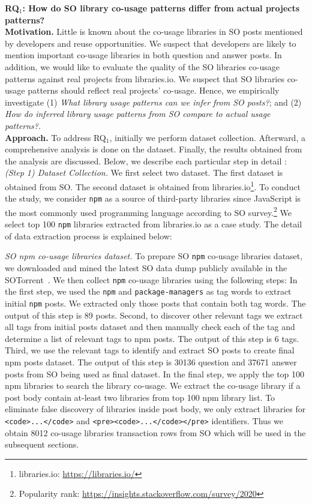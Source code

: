 \documentclass[paper]{ieice}
\newcommand{\RQOne}{\textbf{RQ$_1$: How do SO library co-usage patterns differ from actual projects patterns?}}
\newcommand{\PSOne}{\textit{What library usage patterns can we infer from SO posts?}}
\newcommand{\PSTwo}{\textit{How do inferred library usage patterns from SO compare to actual usage patterns?}}
\begin{document}
\noindent\RQOne
\\

\noindent\textbf{Motivation. }Little is known about the co-usage libraries in SO posts mentioned by developers and reuse opportunities. We suspect that developers are likely to mention important co-usage libraries in both question and answer posts. In addition, we would like to evaluate the quality of the SO libraries co-usage patterns against real projects from libraries.io. We suspect that SO libraries co-usage patterns should reflect real projects' co-usage. Hence, we empirically investigate (1) \PSOne; and (2) \PSTwo.
\\

\noindent\textbf{Approach. }To address RQ$_1$, initially we perform dataset collection.  Afterward, a comprehensive analysis is done on the dataset. Finally, the results obtained from the analysis are discussed. Below, we describe each particular step in detail :
\\

\textit{(Step 1) Dataset Collection.} We first select two dataset. The first dataset is obtained from SO. The second dataset is obtained from libraries.io\footnote{libraries.io: \url{https://libraries.io/}}.
To conduct the study, we consider \texttt{npm} as a source of third-party libraries since JavaScript is the most commonly used programming language according to SO survey.\footnote{Popularity rank: \url{https://insights.stackoverflow.com/survey/2020}}
We select top 100 \texttt{npm} libraries extracted from libraries.io as a case study. The detail of data extraction process is explained below:

\textit{SO npm co-usage libraries dataset.}
\label{subsec:DatasetD1}
To prepare SO \texttt{npm} co-usage libraries dataset, we downloaded and mined the latest SO data dump publicly available in the SOTorrent~\cite{Baltes2018SoTorrent}. We then collect \texttt{npm} co-usage libraries using the following steps: In the first step, we used the \texttt{npm} and \texttt{package-managers} as tag words to extract initial \texttt{npm} posts. We extracted only those posts that contain both tag words. The output of this step is 89 posts. Second, to discover other relevant tags we extract all tags from initial posts dataset and then manually check each of the tag and determine a list of relevant tags to npm posts. The output of this step is 6 tags. Third, we use the relevant tags to identify and extract SO posts to create final npm posts dataset. The output of  this step is 30136 question and 37671 answer posts from SO being used as final dataset. In the final step,  we apply the top 100 npm libraries to search the library co-usage. We extract the co-usage library if a post body contain at-least two libraries from top 100 npm library list. To eliminate false discovery of libraries inside post body, we only extract libraries for \texttt{<code>...</code>} and \texttt{<pre><code>...</code></pre>} identifiers. Thus we obtain 8012 co-usage libraries transaction rows from SO which will be used in the subsequent sections.
\end{document}
